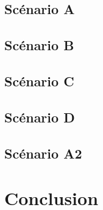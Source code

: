 \documentclass[a4paper, 11pt, french]{report}
\begin{document}
\subsection{Scénario A}


\subsection{Scénario B}


\subsection{Scénario C}


\subsection{Scénario D}


\subsection{Scénario A2}


\section{Conclusion}

\end{document}
